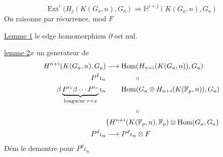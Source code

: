 \[
\operatorname{Ext}^i(H_j(K(G_a,n),G_a)\Longrightarrow\mathbb H^{i+j}(K(G_a,n),G_a)
\]
On raisonne par récurrence, mod $F$

\uline{Lemme 1} le edge homomorphism $\partial$ est nul.

\uline{lemme 2}\qquad $x$ un generateur de
\[
\begin{aligned}
H^{n+i}(K(G_a,n),G_a)&\longrightarrow\operatorname{Hom}(H_{n+i}(K(G_a,n)),G_a)\\
P^I\iota_n&\hspace{4em}\shortparallel\\
\beta\underbrace{P^{i_1}\beta\cdots P^{i_r}}_{\text{longueur }r+s}\iota_n
 &\qquad\operatorname{Hom}(G_a\otimes H_{n+i}(K(\mathbb F_p,n)),G_a)\\
&\hspace{4em}\shortparallel\\
&\big(H^{n+i}(K(\mathbb F_p,n),\mathbb F_p)\otimes\operatorname{Hom}(G_a,G_a)\\
P^d\iota_n&\longrightarrow P^d\iota_n\otimes F
\end{aligned}
\]
Dém\qquad {} le demontre pour $P^0\iota_n$


